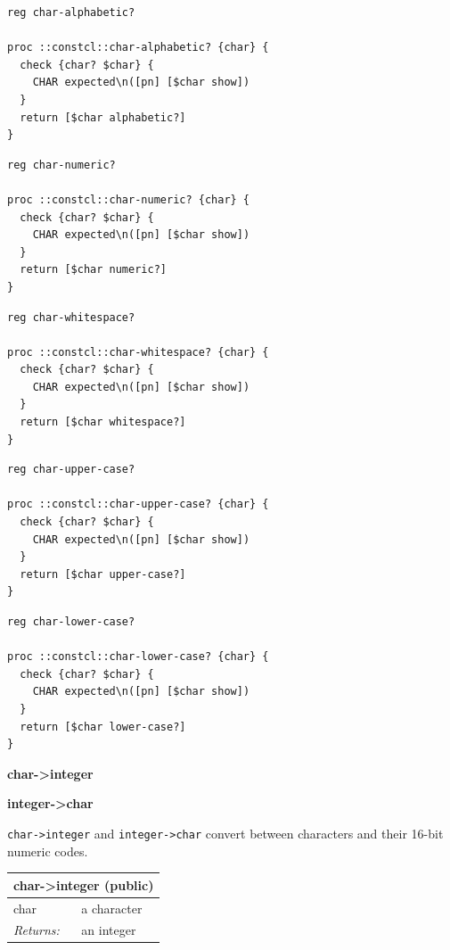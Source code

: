 \documentclass[twoside,9pt]{report}
\begin{document}
\noindent\makebox[\linewidth]{\rule{\linewidth}{0.4pt}}
\begin{lstlisting}
reg char-alphabetic?
 
proc ::constcl::char-alphabetic? {char} {
  check {char? $char} {
    CHAR expected\n([pn] [$char show])
  }
  return [$char alphabetic?]
}
\end{lstlisting}
\noindent\makebox[\linewidth]{\rule{\linewidth}{0.4pt}}
\noindent\makebox[\linewidth]{\rule{\linewidth}{0.4pt}}
\begin{lstlisting}
reg char-numeric?
 
proc ::constcl::char-numeric? {char} {
  check {char? $char} {
    CHAR expected\n([pn] [$char show])
  }
  return [$char numeric?]
}
\end{lstlisting}
\noindent\makebox[\linewidth]{\rule{\linewidth}{0.4pt}}
\noindent\makebox[\linewidth]{\rule{\linewidth}{0.4pt}}
\begin{lstlisting}
reg char-whitespace?
 
proc ::constcl::char-whitespace? {char} {
  check {char? $char} {
    CHAR expected\n([pn] [$char show])
  }
  return [$char whitespace?]
}
\end{lstlisting}
\noindent\makebox[\linewidth]{\rule{\linewidth}{0.4pt}}
\noindent\makebox[\linewidth]{\rule{\linewidth}{0.4pt}}
\begin{lstlisting}
reg char-upper-case?
 
proc ::constcl::char-upper-case? {char} {
  check {char? $char} {
    CHAR expected\n([pn] [$char show])
  }
  return [$char upper-case?]
}
\end{lstlisting}
\noindent\makebox[\linewidth]{\rule{\linewidth}{0.4pt}}
\noindent\makebox[\linewidth]{\rule{\linewidth}{0.4pt}}
\begin{lstlisting}
reg char-lower-case?
 
proc ::constcl::char-lower-case? {char} {
  check {char? $char} {
    CHAR expected\n([pn] [$char show])
  }
  return [$char lower-case?]
}
\end{lstlisting}
\noindent\makebox[\linewidth]{\rule{\linewidth}{0.4pt}}

\textbf{char->integer}


\textbf{integer->char}


\texttt{char->integer} and \texttt{integer->char} convert between characters and their 16-bit numeric codes.

\begin{tabular}{ |l l| }
\hline
\multicolumn{2}{|l|}{char->integer (public)} \\
\hline
char & a character \\
\textit{Returns:} & an integer \\
\hline
\end{tabular}
\end{document}
